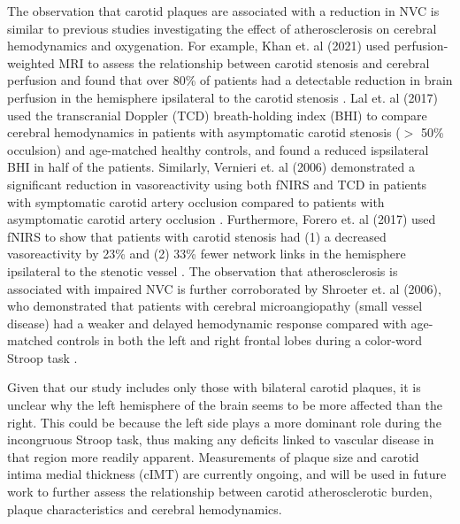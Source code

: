 \documentclass[12pt]{spieman}  %
\begin{document}
\begin{spacing}{2}
The observation that carotid plaques are associated with a reduction in NVC is similar to previous studies investigating the effect of atherosclerosis on cerebral hemodynamics and oxygenation. For example, Khan et. al (2021) used perfusion-weighted MRI to assess the relationship between carotid stenosis and cerebral perfusion and found that over 80\% of patients had a detectable reduction in brain perfusion in the hemisphere ipsilateral to the carotid stenosis \cite{Khan2021}. Lal et. al (2017) used the transcranial Doppler (TCD) breath-holding index (BHI) to compare cerebral hemodynamics in patients with asymptomatic carotid stenosis ($>$ 50\% occulsion) and age-matched healthy controls, and found a reduced ispsilateral BHI in half of the patients\cite{Lal2017}. Similarly, Vernieri et. al (2006) demonstrated a significant reduction in vasoreactivity using both fNIRS and TCD in patients with symptomatic carotid artery occlusion compared to patients with asymptomatic carotid artery occlusion \cite{Vernieri2006}. Furthermore, Forero et. al (2017) used fNIRS to show that patients with carotid stenosis had (1) a decreased vasoreactivity by 23\% and (2) 33\% fewer network links in the hemisphere ipsilateral to the stenotic vessel \cite{Forero2017}. The observation that atherosclerosis is associated with impaired NVC is further corroborated by Shroeter et. al (2006), who demonstrated that patients with cerebral microangiopathy (small vessel disease) had a weaker and delayed hemodynamic response compared with age-matched controls in both the left and right frontal lobes during a color-word Stroop task \cite{Schroeter2007}. 

Given that our study includes only those with bilateral carotid plaques, it is unclear why the left hemisphere of the brain seems to be more affected than the right. This could be because the left side plays a more dominant role during the incongruous Stroop task\cite{Jonides2000}, thus making any deficits linked to vascular disease in that region more readily apparent. Measurements of plaque size and carotid intima medial thickness (cIMT) are currently ongoing, and will be used in future work to further assess the relationship between carotid atherosclerotic burden, plaque characteristics and cerebral hemodynamics. 


\end{spacing}
\end{document}
